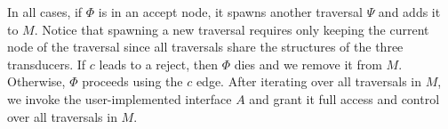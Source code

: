 In all cases, if $\Phi$ is in an accept node, 
it spawns another traversal $\Psi$ and adds it to $M$. 
Notice that spawning a new traversal requires only keeping
the current node of the traversal since all traversals share the
structures of the three transducers.
If $c$ leads to a reject, then $\Phi$ dies 
and we remove it from $M$. 
Otherwise, $\Phi$ proceeds using the $c$ edge.
After iterating over all traversals in $M$, we invoke the 
user-implemented interface $A$
and grant it full access and control over
all traversals in $M$.